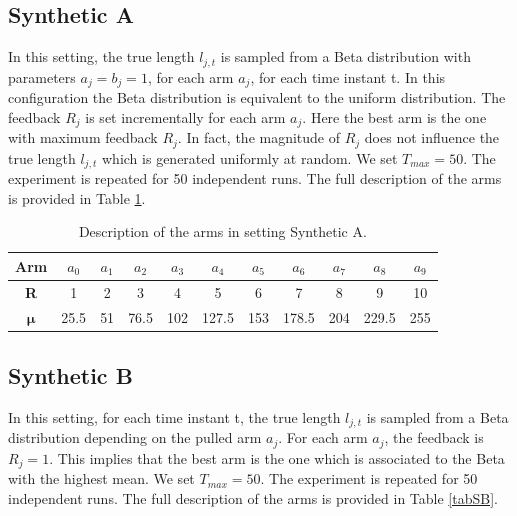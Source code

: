 \subsection{Synthetic A}\label{SA}
In this setting, the true length $l_{j,t}$ is sampled from a Beta distribution with parameters $a_j = b_j = 1$, for each arm $a_j$, for each time instant t. In this configuration the Beta distribution is equivalent to the uniform distribution. The feedback $R_j$ is set incrementally for each arm $a_j$. Here the best arm is the one with maximum feedback $R_j$. In fact, the magnitude of $R_j$ does not influence the true length $l_{j,t}$ which is generated uniformly at random.  We set $T_{max} = 50$. The experiment is repeated for 50 independent runs. The full description of the arms is provided in Table \ref{tabSA}.



\begin{table}[H]
	
	\centering	
	\caption{Description of the arms in setting Synthetic A.}
	\begin{tabular}{|c|cccccccccc|}
		\hline
		\textbf{Arm}       & $a_0$ & $a_1$ & $a_2$ & $a_3$ & $a_4$ & $a_5$ & $a_6$ & $a_7$ & $a_8$ & $a_9$ \\ \hline
		\textbf{R}         & 1     & 2     & 3     & 4     & 5     & 6     & 7     & 8     & 9     & 10    \\
		$\boldsymbol{\mu}$ & 25.5  & 51    & 76.5  & 102   & 127.5 & 153   & 178.5 & 204   & 229.5 & 255   \\ \hline
	\end{tabular}
	
\label{tabSA}
\end{table}
\subsection{Synthetic B}
In this setting, for each time instant t, the true length $l_{j,t}$ is sampled from a Beta distribution depending on the pulled arm $a_j$. For each arm $a_j$, the feedback is $R_j=1$. This implies that the best arm is the one which is associated to the Beta with the highest mean. We set $T_{max}=50$. The experiment is repeated for 50 independent runs. The full description of the arms is provided in Table \ref{tabSB}.


